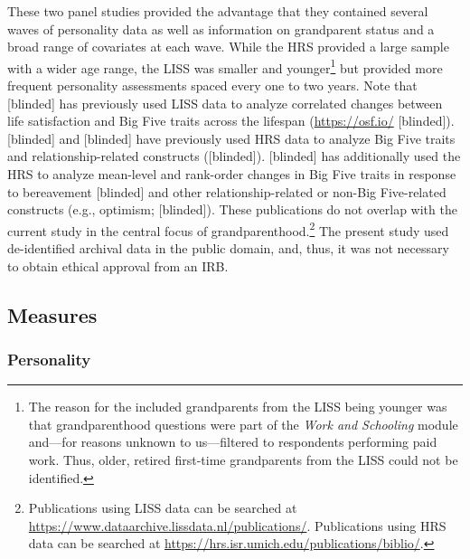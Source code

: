 \documentclass[
  english,
  man, noextraspace]{apa7}
\begin{document}
These two panel studies provided the advantage that they contained several waves of personality data as well as information on grandparent status and a broad range of covariates at each wave. While the HRS provided a large sample with a wider age range, the LISS was smaller and younger\footnote{The reason for the included grandparents from the LISS being younger was that grandparenthood questions were part of the \emph{Work and Schooling} module and---for reasons unknown to us---filtered to respondents performing paid work. Thus, older, retired first-time grandparents from the LISS could not be identified.} but provided more frequent personality assessments spaced every one to two years. Note that {[}blinded{]} has previously used LISS data to analyze correlated changes between life satisfaction and Big Five traits across the lifespan (\url{https://osf.io/} {[}blinded{]}). {[}blinded{]} and {[}blinded{]} have previously used HRS data to analyze Big Five traits and relationship-related constructs ({[}blinded{]}). {[}blinded{]} has additionally used the HRS to analyze mean-level and rank-order changes in Big Five traits in response to bereavement {[}blinded{]} and other relationship-related or non-Big Five-related constructs (e.g., optimism; {[}blinded{]}). These publications do not overlap with the current study in the central focus of grandparenthood.\footnote{Publications using LISS data can be searched at \url{https://www.dataarchive.lissdata.nl/publications/}. Publications using HRS data can be searched at \url{https://hrs.isr.umich.edu/publications/biblio/}.} The present study used de-identified archival data in the public domain, and, thus, it was not necessary to obtain ethical approval from an IRB.

\hypertarget{measures}{%
\subsection{Measures}\label{measures}}

\hypertarget{personality}{%
\subsubsection{Personality}\label{personality}}
\end{document}
